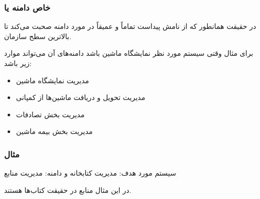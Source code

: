 \subsubsection*{خاص دامنه یا }

در حقیقت همانطور که از نامش پیداست تماماً و عمیقاً در مورد دامنه صحبت می‌کند تا
بالاترین سطح سازمان.

برای مثال وقتی سیستم مورد نظر نمایشگاه ماشین باشد دامنه‌های آن می‌تواند موارد زیر باشد:

\begin{itemize}
    \item مدیریت نمایشگاه ماشین
    \item مدیریت تحویل و دریافت ماشین‌ها از کمپانی
    \item مدیریت بخش تصادفات
    \item مدیریت بخش بیمه ماشین
\end{itemize}

\subsubsection*{مثال}

سیستم مورد هدف: مدیریت کتابخانه و دامنه: مدیریت منابع

در این مثال منابع در حقیقت کتاب‌ها هستند.

